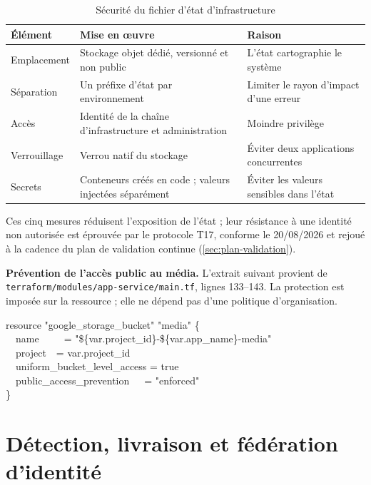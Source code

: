 \begin{table}[!htbp]
\caption{Sécurité du fichier d'état d'infrastructure}
\label{tab:ann-securite-etat}
\centering
\footnotesize
\setlength{\tabcolsep}{4pt}
\begin{tabular}{|P{2.7cm}|P{5.9cm}|P{6.4cm}|}
\hline
\textbf{Élément} & \textbf{Mise en œuvre} & \textbf{Raison} \\
\hline
Emplacement & Stockage objet dédié, versionné et non public & L'état cartographie le système \\ \hline
Séparation & Un préfixe d'état par environnement & Limiter le rayon d'impact d'une erreur \\ \hline
Accès & Identité de la chaîne d'infrastructure et administration & Moindre privilège \\ \hline
Verrouillage & Verrou natif du stockage & Éviter deux applications concurrentes \\ \hline
Secrets & Conteneurs créés en code ; valeurs injectées séparément & Éviter les valeurs sensibles dans l'état \\
\hline
\end{tabular}
\end{table}

Ces cinq mesures réduisent l'exposition de l'état ; leur résistance à une identité non autorisée
est éprouvée par le protocole T17, conforme le 20/08/2026 et rejoué à la cadence du plan de
validation continue (\cref{sec:plan-validation}).


\textbf{Prévention de l'accès public au média.} L'extrait suivant provient de
\texttt{terraform/modules/app-service/main.tf}, lignes 133--143. La protection est imposée sur la
ressource ; elle ne dépend pas d'une politique d'organisation.

\begin{extraitconf}[boxsep=1pt, left=3pt, right=3pt, top=2pt, bottom=2pt]
resource "google\_storage\_bucket" "media" \{\\
\ \ name\ \ \ \ \ = "\$\{var.project\_id\}-\$\{var.app\_name\}-media"\\
\ \ project\ \ = var.project\_id\\[0.4em]
\ \ uniform\_bucket\_level\_access = true\\
\ \ public\_access\_prevention\ \ \ = "enforced"\\
\}
\end{extraitconf}

\section{Détection, livraison et fédération d'identité}

